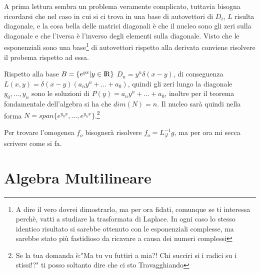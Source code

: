 \documentclass[11pt,a4paper]{report}
\theoremstyle{definition}
\theoremstyle{plain}
\theoremstyle{plain}
\begin{document}
			A prima lettura sembra un problema veramente complicato, tuttavia bisogna ricordarsi che nel caso in cui si ci trova in una base di autovettori di $D_i$, $L$ risulta diagonale, e la cosa bella delle matrici diagonali è che il nucleo sono gli zeri sulla diagonale e che l'iversa è l'inverso degli elementi sulla diagonale.\newline
			Visto che le esponenziali sono una base\footnote{A dire il vero dovrei dimostrarlo, ma per ora fidati, comunque se ti interessa perchè, vatti a studiare la trasformata di Laplace. In ogni caso lo stesso identico risultato si sarebbe ottenuto con le esponenziali complesse, ma sarebbe stato più fastidioso da ricavare a causa dei numeri complessi} di autovettori rispetto alla derivata conviene risolvere il probema rispetto ad essa.\newline

			Rispetto alla base $B=\{e^{yx}|y \in \rm I\!R\}$ $D_n=y^n\delta(x-y)$, di conseguenza $L(x,y)=\delta(x-y)(a_ny^n+\dots+a_0)$, quindi gli zeri lungo la diagonale $y_0,\dots,y_n$ sono le soluzioni di $P(y)=a_ny^n+\dots+a_0$, inoltre per il teorema fondamentale dell'algebra si ha che $dim(N)=n$. Il nucleo sarà quindi nella forma $N=span\{e^{y_0x},\dots,e^{y_nx}\}$.\footnote{Se la tua domanda è:"Ma tu vu futtiri a mia?! Chi succiri si i radici su i stissi!?" ti posso soltanto dire che ci sto Travagghiando}\newline

			Per trovare l'omogenea $f_o$ bisognerà risolvere $f_o=L^{-1}_{|I}g$, ma per ora mi secca scrivere come si fa.










	\chapter{Algebra Multilineare}
\end{document}
